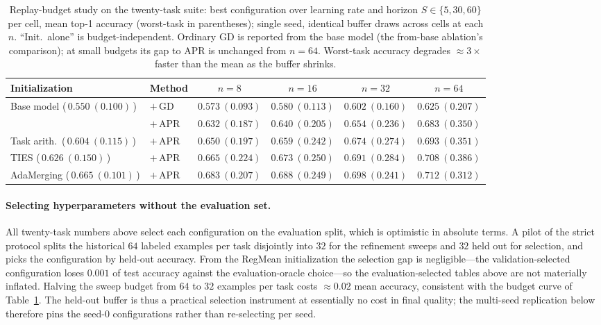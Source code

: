\documentclass[11pt]{article}
\begin{document}
\begin{table}[t]
\centering
\small
\setlength{\tabcolsep}{4pt}
\caption{Replay-budget study on the twenty-task suite: best configuration over learning rate and horizon $S\in\{5,30,60\}$ per cell, mean top-1 accuracy (worst-task in parentheses); single seed, identical buffer draws across cells at each $n$. ``Init.\ alone'' is budget-independent. Ordinary GD is reported from the base model (the from-base ablation's comparison); at small budgets its gap to APR is unchanged from $n=64$. Worst-task accuracy degrades ${\approx}3\times$ faster than the mean as the buffer shrinks.}
\label{tab:clip20nbudget}
\begin{tabular}{llcccc}
\toprule
Initialization & Method & $n{=}8$ & $n{=}16$ & $n{=}32$ & $n{=}64$ \\
\midrule
Base model (\,$0.550\ (0.100)$\,) & $+$\,GD  & $0.573\ (0.093)$ & $0.580\ (0.113)$ & $0.602\ (0.160)$ & $0.625\ (0.207)$ \\
                                  & $+$\,APR & $0.632\ (0.187)$ & $0.640\ (0.205)$ & $0.654\ (0.236)$ & $0.683\ (0.350)$ \\
\midrule
Task arith.\ (\,$0.604\ (0.115)$\,) & $+$\,APR & $0.650\ (0.197)$ & $0.659\ (0.242)$ & $0.674\ (0.274)$ & $0.693\ (0.351)$ \\
TIES (\,$0.626\ (0.150)$\,)         & $+$\,APR & $0.665\ (0.224)$ & $0.673\ (0.250)$ & $0.691\ (0.284)$ & $0.708\ (0.386)$ \\
AdaMerging (\,$0.665\ (0.101)$\,)   & $+$\,APR & $0.683\ (0.207)$ & $0.688\ (0.249)$ & $0.698\ (0.241)$ & $0.712\ (0.312)$ \\
\bottomrule
\end{tabular}
\end{table}

\paragraph{Selecting hyperparameters without the evaluation set.}
All twenty-task numbers above select each configuration on the evaluation split, which is optimistic in absolute terms. A pilot of the strict protocol splits the historical $64$ labeled examples per task disjointly into $32$ for the refinement sweeps and $32$ held out for selection, and picks the configuration by held-out accuracy. From the RegMean initialization the selection gap is negligible---the validation-selected configuration loses $0.001$ of test accuracy against the evaluation-oracle choice---so the evaluation-selected tables above are not materially inflated. Halving the sweep budget from $64$ to $32$ examples per task costs ${\approx}0.02$ mean accuracy, consistent with the budget curve of Table~\ref{tab:clip20nbudget}. The held-out buffer is thus a practical selection instrument at essentially no cost in final quality; the multi-seed replication below therefore pins the seed-$0$ configurations rather than re-selecting per seed.
\end{document}
